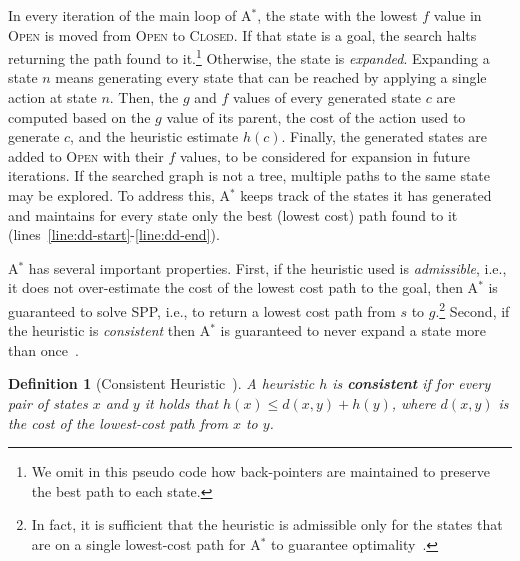 \documentclass{aicom2e}
\newtheorem{definition}{Definition}
\newcommand{\astar}{A$^*$}
\newcommand{\open}{\textsc{Open}}
\newcommand{\closed}{\textsc{Closed}}
\newcommand{\roni}[1]{\textbf{[RS:#1]}}
\begin{document}

In every iteration of the main loop of \astar{}, the state with the lowest $f$ value in \open{}
is moved from \open{} to \closed{}. If that state is a goal, the search halts
returning the path found to it.\footnote{We omit in this pseudo code how
back-pointers are maintained to  preserve the best path to each state.}
Otherwise, the state is {\em expanded}. Expanding a state $n$ means generating
every state that can be reached by applying a single action at state $n$. Then,
the $g$ and $f$ values of every generated state $c$ are computed based on the
$g$ value of its parent, the cost of the action used to generate $c$, and the
heuristic estimate $h(c)$. Finally, the generated states are added to \open{}
with their $f$ values, to be considered for expansion in future iterations. If
the searched graph is not a tree, multiple paths to the same state may be
explored. To address this, \astar{} keeps track of the states it has generated
and maintains for every state only the best (lowest cost) path found to it (lines~\ref{line:dd-start}-\ref{line:dd-end}).









\astar{} has several important properties. First, if the heuristic used is {\em
admissible}, i.e., it does not over-estimate the cost of the lowest cost path
to the goal, then \astar{} is guaranteed to solve SPP, i.e., to return a lowest
cost path from $s$ to $g$.\footnote{In fact, it is sufficient that the
heuristic is admissible only for the states that are on a single lowest-cost
path for \astar{} to guarantee
optimality~\cite{karpas2012optimal,dechter1985generalizedBestFirst}.} Second,
if the heuristic is {\em consistent} then \astar{} is guaranteed to never
expand a state more than once~\cite{hartNR68Astar}.
\begin{definition}[Consistent Heuristic~\cite{hartNR68Astar}]
    A heuristic $h$ is {\bf consistent} if for every pair of states $x$ and $y$
    it holds that $h(x)\leq d(x,y)+h(y)$, where $d(x, y)$ is
    the cost of the lowest-cost path from $x$ to $y$.
    \label{def:consistent}
\end{definition}
\end{document}
